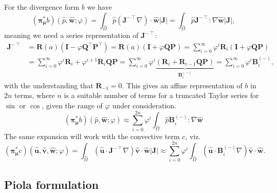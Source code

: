 \documentclass[onecolumn, twoside, a4paper, 11pt]{article}
\begin{document}
For the divergence form $b$ we have
\begin{equation}
  ({\bm\pi}^*_{\bm\mu}b)(
    \hat{p},
    \hat{\bm w};
    \varphi
  ) =
  \int_{\hat{\Omega}} \hat{p} (\bm J^{-\intercal} \nabla) \cdot \hat{\bm w} |\bm J|
  = \int_{\hat{\Omega}} \hat{p} \bm J^{-\intercal} : \nabla \hat{\bm w} |\bm J|,
\end{equation}
meaning we need a series representation of $\bm J^{-\intercal}$:
\begin{align}
  \nonumber
  \bm J^{-\intercal}
  &= \bm R(a) (\bm I - \varphi \bm Q^\intercal \bm P^\intercal)
  = \bm R(a) (\bm I + \varphi \bm Q \bm P)
  = \sum_{i=0}^\infty
    \varphi^i \bm R_i
    (\bm I + \varphi \bm Q \bm P) \\
  &= \sum_{i=0}^\infty
    \varphi^i \bm R_i
    + \varphi^{i+1} \bm R_i \bm Q \bm P
  = \sum_{i=0}^\infty
    \varphi^i \underbrace{\left(
    \bm R_i + \bm R_{i-1} \bm Q \bm P
    \right)}_{\bm B^{(-)}_i}
  = \sum_{i=0}^\infty \varphi^i \bm B^{(-)}_i,
\end{align}
with the understanding that $\bm R_{-1} = 0$. This gives an affine
representation of $b$ in $2n$ terms, where $n$ is a suitable number of terms for
a truncated Taylor series for $\sin$ or $\cos$, given the range of $\varphi$
under consideration.
\begin{equation}
  ({\bm\pi}^*_{\bm\mu}b)(
    \hat{p},
    \hat{\bm w};
    \varphi
  ) \approx \sum_{i=0}^{2n} \varphi^i
  \int_{\hat{\Omega}} \hat{p} \bm B^{(-)}_i : \nabla \hat{\bm w}
\end{equation}
The same expansion will work with the convective term $c$, viz.
\begin{equation}
  ({\bm\pi}^*_{\bm\mu}c)(
    \hat{\bm u},
    \hat{\bm v},
    \hat{\bm w};
    \varphi
  )
  = \int_{\hat{\Omega}} (\hat{\bm u} \cdot \bm J^{-\intercal}\nabla) \hat{\bm v} \cdot \hat{\bm w}
  |\bm J|
  \approx \sum_{i=0}^{2n} \varphi^i \int_{\hat{\Omega}}
    (\hat{\bm u} \cdot \bm B^{(-)}_i \nabla) \hat{\bm v} \cdot \hat{\bm w}.
\end{equation}

\subsection{Piola formulation}
\end{document}
